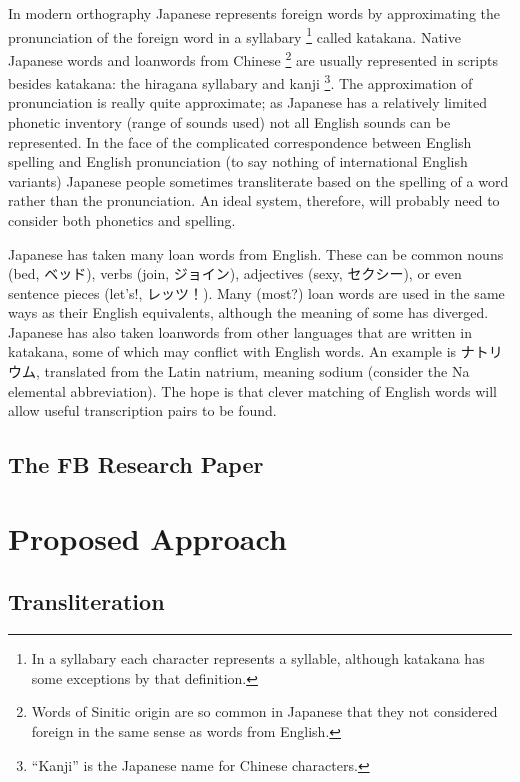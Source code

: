 \documentclass{article}
\begin{document}
In modern orthography
Japanese represents foreign words
by approximating the pronunciation of the foreign word
in a syllabary \footnote{In a syllabary each character represents a syllable,
although katakana has some exceptions by that definition.} called katakana.
Native Japanese words and loanwords from Chinese
\footnote{Words of Sinitic origin are so common in Japanese that they not considered
  foreign in the same sense as words from English.}
are usually represented in scripts besides katakana:
the hiragana syllabary and kanji
\footnote{``Kanji'' is the Japanese name for Chinese characters.}.
The approximation of pronunciation is really quite approximate;
as Japanese has a relatively limited phonetic inventory (range of sounds used)
not all English sounds can be represented.
In the face of the complicated correspondence
between English spelling and English pronunciation
(to say nothing of international English variants)
Japanese people sometimes transliterate based on the spelling of a word
rather than the pronunciation.
An ideal system,
therefore,
will probably need to consider both phonetics and spelling.

Japanese has taken many loan words from English.
These can be common nouns (bed, ベッド),
verbs (join, ジョイン),
adjectives (sexy, セクシー),
or even sentence pieces (let's!, レッツ！).
Many (most?) loan words
are used in the same ways as their English equivalents,
although the meaning of some has diverged.
Japanese has also taken loanwords from other languages
that are written in katakana,
some of which may conflict with English words.
An example is ナトリウム,
translated from the Latin natrium,
meaning sodium (consider the Na elemental abbreviation).
The hope is that clever matching of English words
will allow useful transcription pairs to be found.

\subsection*{The FB Research Paper} %

\section*{Proposed Approach}

\subsection*{Transliteration}
\end{document}
